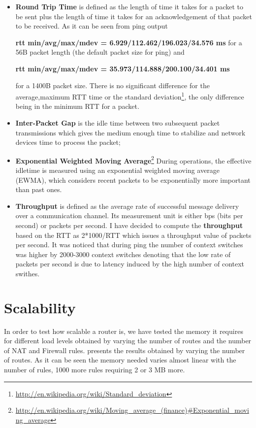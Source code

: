 \begin{itemize}
\item \textbf{Round Trip Time} is defined as the length of time it takes for a packet to be sent plus the length of time it takes for an acknowledgement of that packet to be received.
As it can be seen from ping output 

\textbf{rtt min/avg/max/mdev = 6.929/112.462/196.023/34.576 ms}
for a 56B packet length (the default packet size for ping) and 

\textbf{rtt min/avg/max/mdev = 35.973/114.888/200.100/34.401 ms}

for a 1400B packet size. There is no significant difference for the average,maximum RTT time or the standard deviation\footnote{\url{http://en.wikipedia.org/wiki/Standard_deviation}}, the only difference being in the minimum RTT for a packet.  
\item \textbf{Inter-Packet Gap} is the idle time between two subsequent packet transmissions which gives the medium enough time to stabilize and network devices time to process the packet;

\item \textbf{Exponential Weighted Moving Average}\footnote{\url{http://en.wikipedia.org/wiki/Moving_average_(finance)#Exponential_moving_average}} During operations, the effective idletime is measured using an exponential weighted moving average (EWMA), which considers recent packets to be exponentially more important than past ones. 

\item \textbf{Throughput} is defined as the average rate of successful message delivery over a communication channel. Its measurement unit is either bps (bits per second) or packets per second.
I have decided to compute the \textbf{throughput} based on the RTT as 2*1000/RTT which issues a throughput value of  packets per second. It was noticed that during ping the number of context switches was higher by 2000-3000 context switches denoting that the low rate of packets per second is due to latency induced by the high number of context swithes. 
\end{itemize}
\section{Scalability}
\label{sec:scalability}

In order to test how scalable a router is, we have tested the memory it requires for different load levels obtained by varying the number of routes and the number of NAT and Firewall rules.
 presents the results obtained by varying the number of routes.
As it can be seen the memory needed varies almost linear with the number of rules, 1000 more rules requiring 2 or 3 MB more.

